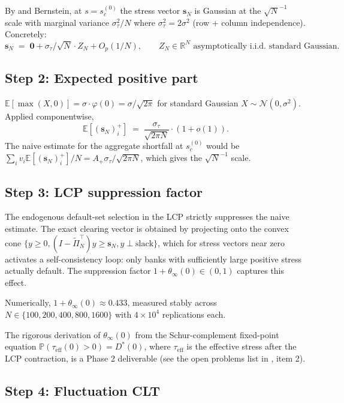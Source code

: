 \documentclass[11pt,a4paper]{article}
\theoremstyle{definition}
\begin{document}
By  and Bernstein, at $s = s_c^{(0)}$ the stress vector
$\mathbf s_N$ is Gaussian at the $\sqrt N^{-1}$ scale with marginal variance
$\sigma_\tau^2/N$ where $\sigma_\tau^2 = 2\sigma^2$ (row + column
independence). Concretely:
\[
\mathbf s_N\;=\;\mathbf 0 + \sigma_\tau/\sqrt N\cdot Z_N + O_p(1/N),\qquad Z_N\in\mathbb{R}^N\text{ asymptotically i.i.d.\ standard Gaussian.}
\]

\subsection{Step 2: Expected positive part}

$\mathbb E[\max(X,0)] = \sigma\cdot\varphi(0) = \sigma/\sqrt{2\pi}$ for
standard Gaussian $X\sim\mathcal N(0,\sigma^2)$. Applied componentwise,
\[
\mathbb E[(\mathbf s_N)_i^+]\;=\;\frac{\sigma_\tau}{\sqrt{2\pi N}}\cdot(1+o(1)).
\]
The naive estimate for the aggregate shortfall at $s_c^{(0)}$ would be
$\sum_i v_i\mathbb E[(\mathbf s_N)_i^+]/N = A_+\sigma_\tau/\sqrt{2\pi N}$,
which gives the $\sqrt N^{-1}$ scale.

\subsection{Step 3: LCP suppression factor}

The endogenous default-set selection in the LCP strictly suppresses the
naive estimate. The exact clearing vector is obtained by projecting onto
the convex cone
$\{y\geq 0,(I-\widetilde\Pi_N^\top)y\geq\mathbf s_N,y\perp\text{slack}\}$,
which for stress vectors near zero activates a self-consistency loop: only
banks with sufficiently large positive stress actually default. The
suppression factor $1+\theta_\infty(0)\in(0,1)$ captures this effect.

Numerically, $1+\theta_\infty(0)\approx 0.433$, measured stably across
$N\in\{100,200,400,800,1600\}$ with $4\times 10^4$ replications each.

The rigorous derivation of $\theta_\infty(0)$ from the Schur-complement
fixed-point equation
$\mathbb P(\tau_{\mathrm{eff}}(0)>0) = D^\ast(0)$, where
$\tau_{\mathrm{eff}}$ is the effective stress after the LCP contraction, is
a Phase 2 deliverable (see the open problems list in , item 2).

\subsection{Step 4: Fluctuation CLT}
\end{document}
